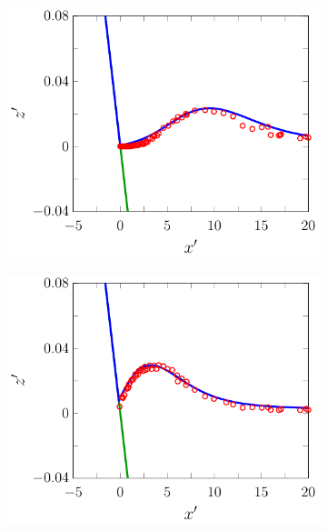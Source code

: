 \begin{figure}
	\centering
	\begin{subfigure}{0.5\textwidth}
		\includegraphics[width=\textwidth]{./chp6/figures/Experiment/Synolakis/H0p0185/FDVM/30s.pdf}
	\end{subfigure}%
	\begin{subfigure}{0.5\textwidth}
		\includegraphics[width=\textwidth]{./chp6/figures/Experiment/Synolakis/H0p0185/FDVM/40s.pdf}
	\end{subfigure}
	\begin{subfigure}{0.5\textwidth}

\end{subfigure}
\end{figure}
